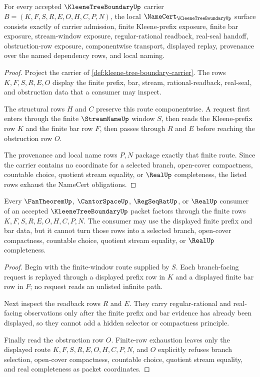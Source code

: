 \begin{theorem}
\label{thm:kleene-tree-boundary-namecert-obligations}
For every accepted $\KleeneTreeBoundaryUp$ carrier $B=(K,F,S,R,E,O,H,C,P,N)$, the local $\NameCert_{\KleeneTreeBoundaryUp}$ surface consists exactly of carrier admission, finite Kleene-prefix exposure, finite bar exposure, stream-window exposure, regular-rational readback, real-seal handoff, obstruction-row exposure, componentwise transport, displayed replay, provenance over the named dependency rows, and local naming.
\end{theorem}
\begin{proof}
Project the carrier of \autoref{def:kleene-tree-boundary-carrier}. The rows $K,F,S,R,E,O$ display the finite prefix, bar, stream, rational-readback, real-seal, and obstruction data that a consumer may inspect.

The structural rows $H$ and $C$ preserve this route componentwise. A request first enters through the finite $\StreamNameUp$ window $S$, then reads the Kleene-prefix row $K$ and the finite bar row $F$, then passes through $R$ and $E$ before reaching the obstruction row $O$.

The provenance and local name rows $P,N$ package exactly that finite route. Since the carrier contains no coordinate for a selected branch, open-cover compactness, countable choice, quotient stream equality, or $\RealUp$ completeness, the listed rows exhaust the NameCert obligations.
\end{proof}

\begin{theorem}
\label{thm:kleene-tree-boundary-finite-bar-refusal}
Every $\FanTheoremUp$, $\CantorSpaceUp$, $\RegSeqRatUp$, or $\RealUp$ consumer of an accepted $\KleeneTreeBoundaryUp$ packet factors through the finite rows $K,F,S,R,E,O,H,C,P,N$. The consumer may use the displayed finite prefix and bar data, but it cannot turn those rows into a selected branch, open-cover compactness, countable choice, quotient stream equality, or $\RealUp$ completeness.
\end{theorem}
\begin{proof}
Begin with the finite-window route supplied by $S$. Each branch-facing request is replayed through a displayed prefix row in $K$ and a displayed finite bar row in $F$; no request reads an unlisted infinite path.

Next inspect the readback rows $R$ and $E$. They carry regular-rational and real-facing observations only after the finite prefix and bar evidence has already been displayed, so they cannot add a hidden selector or compactness principle.

Finally read the obstruction row $O$. Finite-row exhaustion leaves only the displayed route $K,F,S,R,E,O,H,C,P,N$, and $O$ explicitly refuses branch selection, open-cover compactness, countable choice, quotient stream equality, and real completeness as packet coordinates.
\end{proof}

